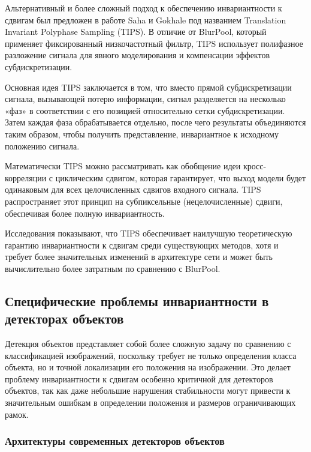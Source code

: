 Альтернативный и более сложный подход к обеспечению инвариантности к сдвигам был предложен в работе Saha и Gokhale \cite{saha2024tips} под названием Translation Invariant Polyphase Sampling (TIPS). В отличие от BlurPool, который применяет фиксированный низкочастотный фильтр, TIPS использует полифазное разложение сигнала для явного моделирования и компенсации эффектов субдискретизации.

Основная идея TIPS заключается в том, что вместо прямой субдискретизации сигнала, вызывающей потерю информации, сигнал разделяется на несколько «фаз» в соответствии с его позицией относительно сетки субдискретизации. Затем каждая фаза обрабатывается отдельно, после чего результаты объединяются таким образом, чтобы получить представление, инвариантное к исходному положению сигнала.

Математически TIPS можно рассматривать как обобщение идеи кросс-корреляции с циклическим сдвигом, которая гарантирует, что выход модели будет одинаковым для всех целочисленных сдвигов входного сигнала. TIPS распространяет этот принцип на субпиксельные (нецелочисленные) сдвиги, обеспечивая более полную инвариантность.

Исследования показывают, что TIPS обеспечивает наилучшую теоретическую гарантию инвариантности к сдвигам среди существующих методов, хотя и требует более значительных изменений в архитектуре сети и может быть вычислительно более затратным по сравнению с BlurPool.

\subsection{Специфические проблемы инвариантности в детекторах объектов}
\label{review:detectors}

Детекция объектов представляет собой более сложную задачу по сравнению с классификацией изображений, поскольку требует не только определения класса объекта, но и точной локализации его положения на изображении. Это делает проблему инвариантности к сдвигам особенно критичной для детекторов объектов, так как даже небольшие нарушения стабильности могут привести к значительным ошибкам в определении положения и размеров ограничивающих рамок.

\subsubsection{Архитектуры современных детекторов объектов}
\label{review:detectors:architectures}

